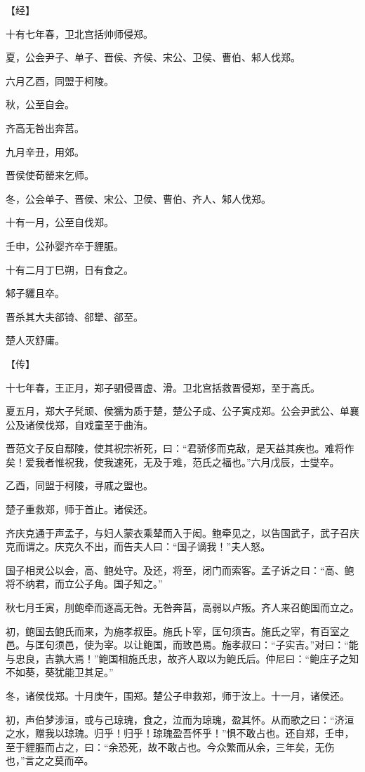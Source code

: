 \documentclass[a4paper,12pt,UTF8,twoside]{ctexbook}
\begin{document}
【经】

十有七年春，卫北宫括帅师侵郑。

夏，公会尹子、单子、晋侯、齐侯、宋公、卫侯、曹伯、邾人伐郑。

六月乙酉，同盟于柯陵。

秋，公至自会。

齐高无咎出奔莒。

九月辛丑，用郊。

晋侯使荀罃来乞师。

冬，公会单子、晋侯、宋公、卫侯、曹伯、齐人、邾人伐郑。

十有一月，公至自伐郑。

壬申，公孙婴齐卒于貍脤。

十有二月丁巳朔，日有食之。

邾子貜且卒。

晋杀其大夫郤锜、郤犫、郤至。

楚人灭舒庸。

【传】

十七年春，王正月，郑子驷侵晋虚、滑。卫北宫括救晋侵郑，至于高氏。

夏五月，郑大子髠顽、侯獳为质于楚，楚公子成、公子寅戍郑。公会尹武公、单襄公及诸侯伐郑，自戏童至于曲洧。

晋范文子反自鄢陵，使其祝宗祈死，曰：“君骄侈而克敌，是天益其疾也。难将作矣！爱我者惟祝我，使我速死，无及于难，范氏之福也。”六月戊辰，士燮卒。

乙酉，同盟于柯陵，寻戚之盟也。

楚子重救郑，师于首止。诸侯还。

齐庆克通于声孟子，与妇人蒙衣乘辇而入于闳。鲍牵见之，以告国武子，武子召庆克而谓之。庆克久不出，而告夫人曰：“国子谪我！”夫人怒。

国子相灵公以会，高、鲍处守。及还，将至，闭门而索客。孟子诉之曰：“高、鲍将不纳君，而立公子角。国子知之。”

秋七月壬寅，刖鲍牵而逐高无咎。无咎奔莒，高弱以卢叛。齐人来召鲍国而立之。

初，鲍国去鲍氏而来，为施孝叔臣。施氏卜宰，匡句须吉。施氏之宰，有百室之邑。与匡句须邑，使为宰。以让鲍国，而致邑焉。施孝叔曰：“子实吉。”对曰：“能与忠良，吉孰大焉！”鲍国相施氏忠，故齐人取以为鲍氏后。仲尼曰：“鲍庄子之知不如葵，葵犹能卫其足。”

冬，诸侯伐郑。十月庚午，围郑。楚公子申救郑，师于汝上。十一月，诸侯还。

初，声伯梦涉洹，或与己琼瑰，食之，泣而为琼瑰，盈其怀。从而歌之曰：“济洹之水，赠我以琼瑰。归乎！归乎！琼瑰盈吾怀乎！”惧不敢占也。还自郑，壬申，至于貍脤而占之，曰：“余恐死，故不敢占也。今众繁而从余，三年矣，无伤也，”言之之莫而卒。
\end{document}
